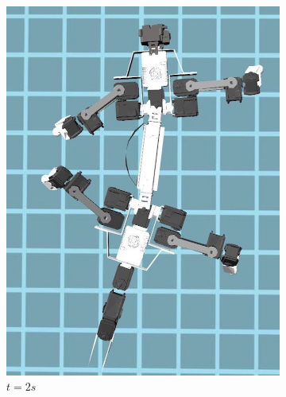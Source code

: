 \documentclass[../document.tex]{subfiles}
\begin{document}
\begin{figure}[htbp]
\begin{subfigure}[b]{0.3\textwidth}
            \includegraphics[width=\textwidth]{../img/krock-moving-2}
            \caption{$t=2s$}
        \end{subfigure}    
       \begin{subfigure}[b]{0.3\textwidth}

\end{subfigure}
\end{figure}
\end{document}
